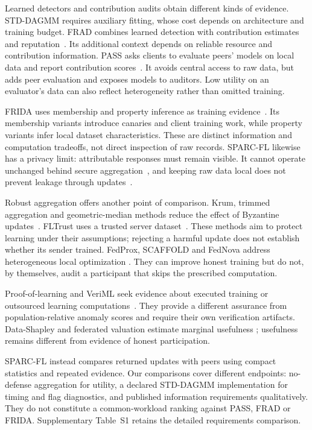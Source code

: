 \documentclass[journal]{IEEEtran}
\begin{document}
Learned detectors and contribution audits obtain different kinds of
evidence. STD-DAGMM requires auxiliary fitting, whose cost depends on
architecture and training budget. FRAD combines learned detection with
contribution estimates and reputation~\cite{wang2024frad}. Its additional
context depends on reliable resource and contribution information.
PASS asks clients to evaluate peers' models on local data and report
contribution scores~\cite{wang2024pass}. It avoids central access to raw
data, but adds peer evaluation and exposes models to auditors. Low
utility on an evaluator's data can also reflect heterogeneity rather
than omitted training.

FRIDA uses membership and property inference as training
evidence~\cite{recasens2026frida}. Its membership variants introduce
canaries and client training work, while property variants infer local
dataset characteristics. These are distinct information and computation
tradeoffs, not direct inspection of raw records. SPARC-FL likewise has a
privacy limit: attributable responses must remain visible. It cannot
operate unchanged behind secure aggregation~\cite{bonawitz2017practical},
and keeping raw data local does not prevent leakage through
updates~\cite{zhu2019leakage,melis2019leakage}.

Robust aggregation offers another point of comparison. Krum, trimmed
aggregation and geometric-median methods reduce the effect of Byzantine
updates~\cite{blanchard2017krum,yin2018byzantine,pillutla2022rfa}.
FLTrust uses a trusted server dataset~\cite{cao2021fltrust}. These methods
aim to protect learning under their assumptions; rejecting a harmful
update does not establish whether its sender trained. FedProx, SCAFFOLD
and FedNova address heterogeneous local optimization
\cite{li2020fedprox,karimireddy2020scaffold,wang2020fednova}. They can
improve honest training but do not, by themselves, audit a participant
that skips the prescribed computation.

Proof-of-learning and VeriML seek evidence about executed training or
outsourced learning computations~\cite{jia2021prooflearning,zhao2021veriml}.
They provide a different assurance from population-relative anomaly
scores and require their own verification artifacts. Data-Shapley and
federated valuation estimate marginal usefulness
\cite{ghorbani2019datashapley,jia2019datavaluation,liu2022gtgshapley};
usefulness remains different from evidence of honest participation.

SPARC-FL instead compares returned updates with peers using compact
statistics and repeated evidence. Our comparisons cover different
endpoints: no-defense aggregation for utility, a declared STD-DAGMM
implementation for timing and flag diagnostics, and published information
requirements qualitatively. They do not constitute a common-workload
ranking against PASS, FRAD or FRIDA. Supplementary Table~S1 retains the
detailed requirements comparison.
\end{document}
